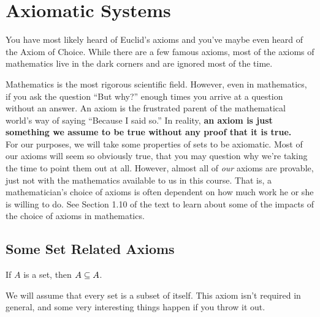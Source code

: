 \chapter{Axiomatic Systems}

You have most likely heard of Euclid's axioms and you've maybe even heard of the Axiom of Choice.  While there are a few famous axioms, most of the axioms of mathematics live in the dark corners and are ignored most of the time.
\begin{center}
\end{center}

Mathematics is the most rigorous scientific field.  However, even in mathematics, if you ask the question ``But why?'' enough times you arrive at a question without an answer.  An axiom is the frustrated parent of the mathematical world's way of saying ``Because I said so.''  In reality, \textbf{an axiom is just something we assume to be true without any proof that it is true.}\\

For our purposes, we will take some properties of sets to be axiomatic.  Most of our axioms will seem so obviously true, that you may question why we're taking the time to point them out at all.  However, almost all of \textit{our} axioms are provable, just not with the mathematics available to us in this course.  That is, a mathematician's choice of axioms is often dependent on how much work he or she is willing to do.  See Section 1.10 of the text to learn about some of the impacts of the choice of axioms in mathematics.

\section{Some Set Related Axioms}

\begin{axiom} If $A$ is a set, then $A \subseteq A$.
\end{axiom}
	We will assume that every set is a subset of itself.  This axiom isn't required in general, and some very interesting things happen if you throw it out.\\
	
